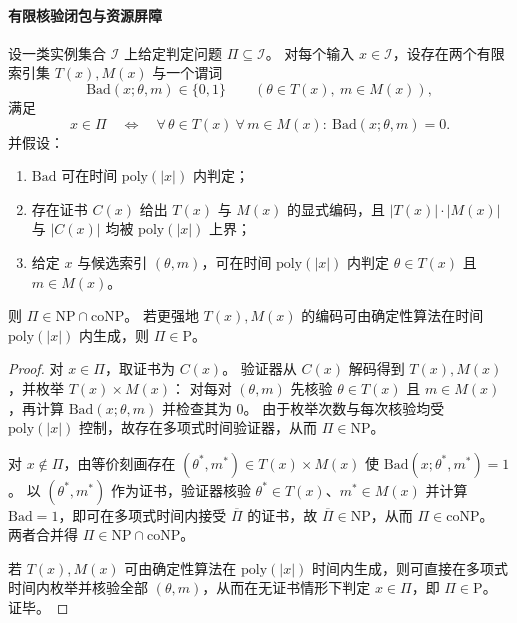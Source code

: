 \paragraph{有限核验闭包与资源屏障}
\begin{theorem}[有限核验判定的双向证书结构]\label{thm:spg-finite-audit-bidirectional-certificates-np-conp}
设一类实例集合 \(\mathcal I\) 上给定判定问题 \(\Pi\subseteq\mathcal I\)。
对每个输入 \(x\in\mathcal I\)，设存在两个有限索引集 \(T(x),M(x)\) 与一个谓词
\[
\mathrm{Bad}(x;\theta,m)\in\{0,1\}\qquad(\theta\in T(x),\ m\in M(x)),
\]
满足
\[
x\in\Pi\quad\Longleftrightarrow\quad
\forall\,\theta\in T(x)\ \forall\,m\in M(x):\ \mathrm{Bad}(x;\theta,m)=0.
\]
并假设：
\begin{enumerate}
  \item \(\mathrm{Bad}\) 可在时间 \(\mathrm{poly}(|x|)\) 内判定；
  \item 存在证书 \(C(x)\) 给出 \(T(x)\) 与 \(M(x)\) 的显式编码，且 \(|T(x)|\cdot|M(x)|\) 与 \(|C(x)|\) 均被 \(\mathrm{poly}(|x|)\) 上界；
  \item 给定 \(x\) 与候选索引 \((\theta,m)\)，可在时间 \(\mathrm{poly}(|x|)\) 内判定 \(\theta\in T(x)\) 且 \(m\in M(x)\)。
\end{enumerate}
则 \(\Pi\in \mathrm{NP}\cap \mathrm{coNP}\)。
若更强地 \(T(x),M(x)\) 的编码可由确定性算法在时间 \(\mathrm{poly}(|x|)\) 内生成，则 \(\Pi\in\mathrm{P}\)。
\end{theorem}
\begin{proof}
对 \(x\in\Pi\)，取证书为 \(C(x)\)。
验证器从 \(C(x)\) 解码得到 \(T(x),M(x)\)，并枚举 \(T(x)\times M(x)\)：
对每对 \((\theta,m)\) 先核验 \(\theta\in T(x)\) 且 \(m\in M(x)\)，再计算 \(\mathrm{Bad}(x;\theta,m)\) 并检查其为 \(0\)。
由于枚举次数与每次核验均受 \(\mathrm{poly}(|x|)\) 控制，故存在多项式时间验证器，从而 \(\Pi\in\mathrm{NP}\)。
\par
对 \(x\notin\Pi\)，由等价刻画存在 \((\theta^\ast,m^\ast)\in T(x)\times M(x)\) 使 \(\mathrm{Bad}(x;\theta^\ast,m^\ast)=1\)。
以 \((\theta^\ast,m^\ast)\) 作为证书，验证器核验 \(\theta^\ast\in T(x)\)、\(m^\ast\in M(x)\) 并计算 \(\mathrm{Bad}=1\)，即可在多项式时间内接受 \(\overline\Pi\) 的证书，故 \(\overline\Pi\in\mathrm{NP}\)，从而 \(\Pi\in\mathrm{coNP}\)。
两者合并得 \(\Pi\in\mathrm{NP}\cap\mathrm{coNP}\)。
\par
若 \(T(x),M(x)\) 可由确定性算法在 \(\mathrm{poly}(|x|)\) 时间内生成，则可直接在多项式时间内枚举并核验全部 \((\theta,m)\)，从而在无证书情形下判定 \(x\in\Pi\)，即 \(\Pi\in\mathrm{P}\)。
证毕。
\end{proof}

